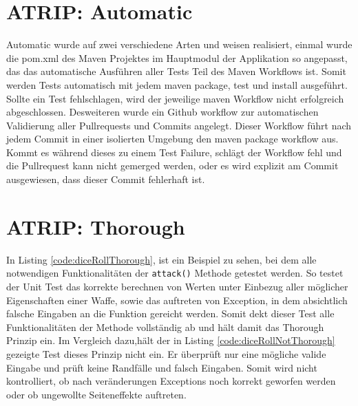 \section{ATRIP: Automatic}
Automatic wurde auf zwei verschiedene Arten und weisen realisiert, einmal wurde die pom.xml des Maven Projektes im Hauptmodul der Applikation so angepasst, das das automatische Ausführen aller Tests Teil des Maven Workflows ist. Somit werden Tests automatisch mit jedem maven package, test und install ausgeführt. Sollte ein Test fehlschlagen, wird der jeweilige maven Workflow nicht erfolgreich abgeschlossen. Desweiteren wurde ein Github workflow zur automatischen Validierung aller Pullrequests und Commits angelegt. Dieser Workflow führt nach jedem Commit in einer isolierten Umgebung den maven package workflow aus. Kommt es während dieses zu einem Test Failure, schlägt der Workflow fehl und die Pullrequest kann nicht gemerged werden, oder es wird explizit am Commit ausgewiesen, dass dieser Commit fehlerhaft ist.

\clearpage
\section{ATRIP: Thorough}

In Listing \ref{code:diceRollThorough}, ist ein Beispiel zu sehen, bei dem alle notwendigen Funktionalitäten der \texttt{attack()} Methode getestet werden. So testet der Unit Test das korrekte berechnen von Werten unter Einbezug aller möglicher Eigenschaften einer Waffe, sowie das auftreten von Exception, in dem absichtlich falsche Eingaben an die Funktion gereicht werden. Somit dekt dieser Test alle Funktionalitäten der Methode vollständig ab und hält damit das Thorough Prinzip ein. Im Vergleich dazu,hält der in Listing \ref{code:diceRollNotThorough} gezeigte Test dieses Prinzip nicht ein. Er überprüft nur eine mögliche valide Eingabe und prüft keine Randfälle und falsch Eingaben. Somit wird nicht kontrolliert, ob nach veränderungen Exceptions noch korrekt geworfen werden oder ob ungewollte Seiteneffekte auftreten. 


